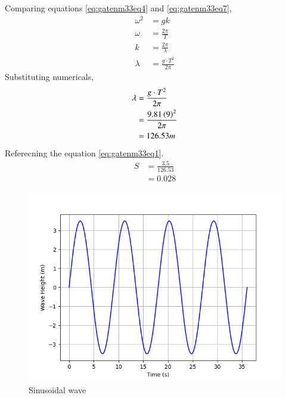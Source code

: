 \documentclass[journal,12pt,onecolumn]{IEEEtran}
\theoremstyle{remark}
\begin{document}
Comparing equations \eqref{eq:gatenm33eq4} and \eqref{eq:gatenm33eq7},\\
\begin{align}
\omega^2 &= gk \label{eq:gatenm33eq8} \\
\omega &= \frac{2 \pi}{T} \label{eq:gatenm33eq9} \\
k &= \frac{2 \pi}{\lambda} \label{eq:gatenm33eq10} \\
\lambda &= \frac{g \cdot T^2}{2 \pi} \label{eq:gatenm33eq11}
\end{align}
Substituting numericals,\\
\begin{align}
\lambda&=\frac{g \cdot T^2}{2\pi}\\ 
&=\frac{9.81 \left(9\right)^2}{2\pi}\\ 
&=126.53m 
\end{align}
Referecning the equation \eqref{eq:gatenm33eq1}.\\
\begin{align}
S&=\frac{3.5}{126.53}\\ 
&=0.028 
\end{align}
\begin{figure}[h]
    \centering
    \includegraphics[width=\columnwidth]{figs/plot.png}
    \caption{Sinusoidal wave}
    \label{fig:}
\end{figure} 
\end{document}
